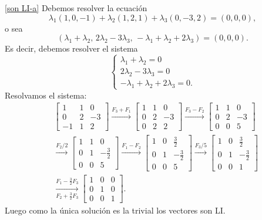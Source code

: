 \begin{enumerate}[resume, topsep=6pt, itemsep=.4cm]
    \ref{son LI-a} Debemos resolver la ecuación
    $$
    \lambda_1 (1,0,-1)+\lambda_2 (1,2,1)+\lambda_3 (0,-3,2)=(0,0,0),
    $$
    o sea
    $$
    (\lambda_1+\lambda_2,\,2\lambda_2-3\lambda_3,\,-\lambda_1+\lambda_2+2\lambda_3)=(0,0,0).
    $$
    Es decir, debemos resolver el sistema
    $$
    \begin{cases}
        \lambda_1 +\lambda_2 = 0\\
        2\lambda_2 -3\lambda_3 = 0\\
        -\lambda_1 +\lambda_2 +2\lambda_3 = 0.
    \end{cases}
    $$
    Resolvamos el sistema:
    \begin{align*}
    &\begin{bmatrix}
        1 & 1 & 0\\
        0 & 2 & -3\\
        -1 & 1 & 2
    \end{bmatrix}
    \stackrel{F_3+F_1}{\longrightarrow}
    \begin{bmatrix}
        1 & 1 & 0 \\
        0 & 2 & -3 \\
        0 & 2 & 2 
    \end{bmatrix}
    \stackrel{F_3-F_2}{\longrightarrow}
    \begin{bmatrix}
        1 & 1 & 0 \\
        0 & 2 & -3 \\
        0 & 0 & 5 
    \end{bmatrix} \\
    &\stackrel{F_2/2}{\longrightarrow}
    \begin{bmatrix}
        1 & 1 & 0 \\
        0 & 1 & -\frac32 \\
        0 & 0 & 5
    \end{bmatrix}
    \stackrel{F_1-F_2}{\longrightarrow}
    \begin{bmatrix}
        1 & 0 & \frac32 \\
        0 & 1 & -\frac32 \\
        0 & 0 & 5
    \end{bmatrix}
    \stackrel{F_3/5}{\longrightarrow}
    \begin{bmatrix}
        1 & 0 & \frac32 \\
        0 & 1 & -\frac32 \\
        0 & 0 & 1
    \end{bmatrix} \\
    &\underset{F_2+\frac32 F_3}{\stackrel{F_1-\frac32 F_3}{\longrightarrow}}
    \begin{bmatrix}
        1 & 0 & 0 \\
        0 & 1 & 0 \\
        0 & 0 & 1
    \end{bmatrix}.
    \end{align*}
    Luego  como la única solución es la trivial los vectores son LI.


\end{enumerate}
